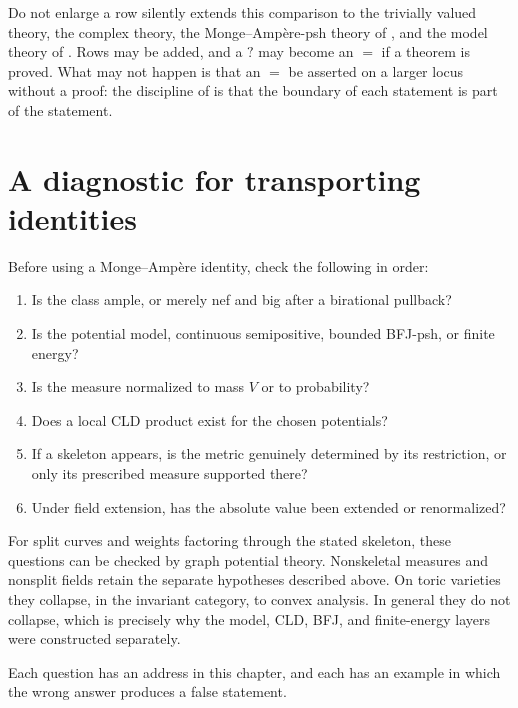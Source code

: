 \begin{warning}{Do not enlarge a row silently}
 extends this comparison to the trivially
valued theory, the complex theory, the Monge--Amp\`ere-psh theory of
, and the model theory of .  Rows
may be added, and a $?$ may become an $=$ if a theorem is proved.  What
may not happen is that an $=$ be asserted on a larger locus without a
proof: the discipline of  is that the boundary of
each statement is part of the statement.
\end{warning}

\section{A diagnostic for transporting identities}
\label{sec:ch31-diagnostic}

Before using a Monge--Amp\`ere identity, check the following in order:
\begin{enumerate}
\item\label{itm:ch31-diag:class} Is the class ample, or merely nef and big
      after a birational pullback?
\item\label{itm:ch31-diag:potential} Is the potential model, continuous
      semipositive, bounded BFJ-psh, or finite energy?
\item\label{itm:ch31-diag:mass} Is the measure normalized to mass $V$ or to
      probability?
\item\label{itm:ch31-diag:cld} Does a local CLD product exist for the chosen
      potentials?
\item\label{itm:ch31-diag:skeleton} If a skeleton appears, is the metric
      genuinely determined by its restriction, or only its prescribed measure
      supported there?
\item\label{itm:ch31-diag:field} Under field extension, has the absolute
      value been extended or renormalized?
\end{enumerate}

For split curves and weights factoring through the stated skeleton, these
questions can be checked by graph potential theory.  Nonskeletal measures
and nonsplit fields retain the separate hypotheses described above.  On toric
varieties they collapse, in the invariant category, to convex analysis.  In
general they do not collapse, which is precisely why the model, CLD, BFJ,
and finite-energy layers were constructed separately.

Each question has an address in this chapter, and each has an example in
which the wrong answer produces a false statement.

